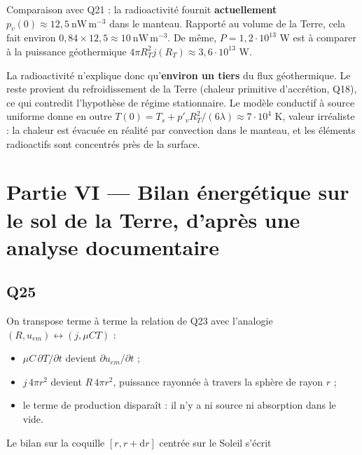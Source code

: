 \documentclass[11pt,a4paper]{article}
\providecommand{\tightlist}{\setlength{\itemsep}{0pt}\setlength{\parskip}{0pt}}
\newcommand{\equationajustee}[1]{%
  \sbox{\boiteequation}{$\displaystyle #1$}%
  \ifdim\wd\boiteequation>\linewidth
    \[\resizebox{\linewidth}{!}{\usebox{\boiteequation}}\]%
  \else
    \[#1\]%
  \fi}
\begin{document}
Comparaison avec Q21 : la radioactivité fournit \textbf{actuellement} \(p_v(0)\approx12{,}5\ \mathrm{nW\,m^{-3}}\) dans le manteau. Rapporté au volume de la Terre, cela fait environ \(0{,}84\times12{,}5\approx10\ \mathrm{nW\,m^{-3}}\). De même, \(P=1{,}2\cdot10^{13}\) W est à comparer à la puissance géothermique \(4\pi R_T^2j(R_T)\approx3{,}6\cdot10^{13}\) W.

La radioactivité n'explique donc qu'\textbf{environ un tiers} du flux géothermique. Le reste provient du refroidissement de la Terre (chaleur primitive d'accrétion, Q18), ce qui contredit l'hypothèse de régime stationnaire. Le modèle conductif à source uniforme donne en outre \(T(0)=T_s+p'_vR_T^2/(6\lambda)\approx7\cdot10^4\) K, valeur irréaliste : la chaleur est évacuée en réalité par convection dans le manteau, et les éléments radioactifs sont concentrés près de la surface.

\hypertarget{partie-vi-bilan-uxe9nerguxe9tique-sur-le-sol-de-la-terre-dapruxe8s-une-analyse-documentaire}{%
\section{Partie VI --- Bilan énergétique sur le sol de la Terre, d'après une analyse documentaire}\label{partie-vi-bilan-uxe9nerguxe9tique-sur-le-sol-de-la-terre-dapruxe8s-une-analyse-documentaire}}

\hypertarget{q25}{%
\subsection{Q25}\label{q25}}

On transpose terme à terme la relation de Q23 avec l'analogie \((R,u_{em})\leftrightarrow(j,\mu CT)\) :

\begin{itemize}
\tightlist
\item
  \(\mu C\,\partial T/\partial t\) devient \(\partial u_{em}/\partial t\) ;
\item
  \(j\,4\pi r^2\) devient \(R\,4\pi r^2\), puissance rayonnée à travers la sphère de rayon \(r\) ;
\item
  le terme de production disparaît : il n'y a ni source ni absorption dans le vide.
\end{itemize}

Le bilan sur la coquille \([r,r+\mathrm dr]\) centrée sur le Soleil s'écrit

\equationajustee{\boxed{4\pi r^2\,\frac{\partial u_{em}}{\partial t}\,\mathrm dt\,\mathrm dr=-\mathrm d\!\left(R\,4\pi r^2\right)\mathrm dt}}
\end{document}
